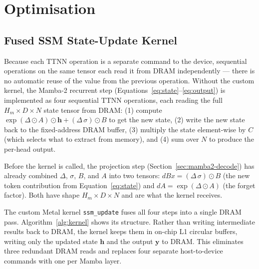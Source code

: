 \section{Optimisation}
\label{sec:optimisation}

\subsection{Fused SSM State-Update Kernel}
\label{sec:ssm-kernel}

Because each TTNN operation is a separate command to the device, sequential operations on the same tensor each read it from DRAM independently — there is no automatic reuse of the value from the previous operation. Without the custom kernel, the Mamba-2 recurrent step (Equations~\ref{eq:state}--\ref{eq:output}) is implemented as four sequential TTNN operations, each reading the full $H_m \times D \times N$ state tensor from DRAM: (1) compute $\exp(\Delta \odot A) \odot \mathbf{h} + (\Delta\,\sigma) \odot B$ to get the new state, (2) write the new state back to the fixed-address DRAM buffer, (3) multiply the state element-wise by $C$ (which selects what to extract from memory), and (4) sum over $N$ to produce the per-head output.

Before the kernel is called, the projection step (Section~\ref{sec:mamba2-decode}) has already combined $\Delta$, $\sigma$, $B$, and $A$ into two tensors: $\mathit{dBx} = (\Delta\,\sigma) \odot B$ (the new token contribution from Equation~\ref{eq:state}) and $\mathit{dA} = \exp(\Delta \odot A)$ (the forget factor). Both have shape $H_m \times D \times N$ and are what the kernel receives.

The custom Metal kernel \texttt{ssm\_update} fuses all four steps into a single DRAM pass. Algorithm~\ref{alg:kernel} shows its structure. Rather than writing intermediate results back to DRAM, the kernel keeps them in on-chip L1 circular buffers, writing only the updated state $\mathbf{h}$ and the output $\mathbf{y}$ to DRAM. This eliminates three redundant DRAM reads and replaces four separate host-to-device commands with one per Mamba layer.

